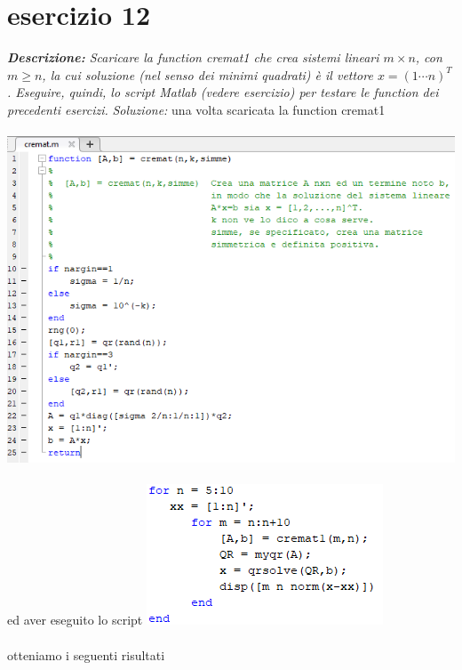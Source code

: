 \section{esercizio 12}
\textit{\textbf{Descrizione:} Scaricare la function cremat1 che crea sistemi lineari $m \times n$, con $m \geq n$, la cui soluzione (nel senso dei minimi quadrati) è il vettore $x = (1 \cdots n)^{T}$. Eseguire, quindi, lo script Matlab (vedere esercizio) per testare le function dei precedenti esercizi.}\newline
\noindent\emph{Soluzione: }\newline
una volta scaricata la function cremat1
\\~\\
\includegraphics[width=1.3\linewidth]{img/cremat.png}\\~\\
ed aver eseguito lo script
\includegraphics[width=.8\linewidth]{img/ex13.png}\\~\\
otteniamo i seguenti risultati
\\~\\
